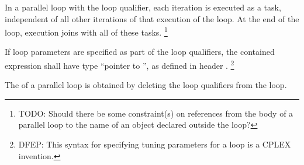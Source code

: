 \pnum
In a parallel loop with the
loop qualifier,
each iteration is
executed as a task, independent of
all other iterations of that execution of the loop.
At the end of the loop,
execution joins with all of these tasks.
\footnote{TODO:
Should there be some constraint(s) on references
from the body of a parallel loop
to the name of an object declared outside the loop?
}

\pnum
If loop parameters are specified as part of the loop qualifiers,
the contained expression shall have type
``pointer to '',
as defined in header
.%
\footnote{DFEP:
This syntax for specifying tuning parameters for a loop
is a CPLEX invention.
}

\pnum
The
of a parallel loop
is obtained by deleting the loop qualifiers from the loop.